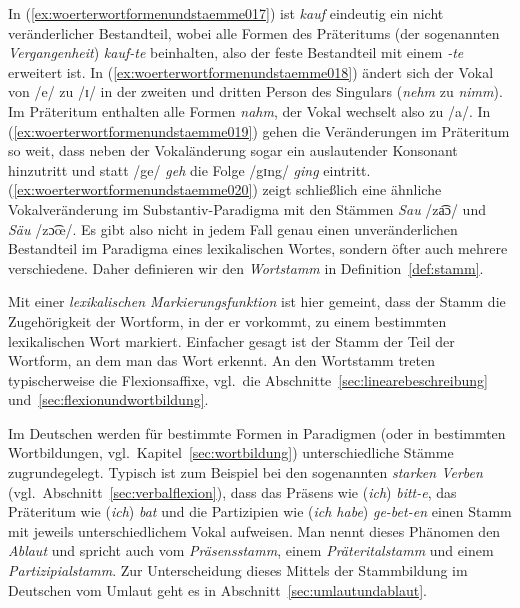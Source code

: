 In (\ref{ex:woerterwortformenundstaemme017}) ist \textit{kauf} eindeutig ein nicht veränderlicher Bestandteil, wobei alle Formen des Präteritums (der sogenannten \textit{Vergangenheit}) \textit{kauf-te} beinhalten, also der feste Bestandteil mit einem \textit{-te} erweitert ist.
In (\ref{ex:woerterwortformenundstaemme018}) ändert sich der Vokal von /e/ zu /ɪ/ in der zweiten und dritten Person des Singulars (\textit{nehm} zu \textit{nimm}).
Im Präteritum enthalten alle Formen \textit{nahm}, der Vokal wechselt also zu /a/.
In (\ref{ex:woerterwortformenundstaemme019}) gehen die Veränderungen im Präteritum so weit, dass neben der Vokaländerung sogar ein auslautender Konsonant hinzutritt und statt /ge/ \textit{geh} die Folge /gɪng/ \textit{ging} eintritt.
(\ref{ex:woerterwortformenundstaemme020}) zeigt schließlich eine ähnliche Vokalveränderung im Substantiv-Paradigma mit den Stämmen \textit{Sau} /za͡ɔ/ und \textit{Säu} /zɔ͡œ/.
Es gibt also nicht in jedem Fall genau einen unveränderlichen Bestandteil im Paradigma eines lexikalischen Wortes, sondern öfter auch mehrere verschiedene.
Daher definieren wir den \textit{Wortstamm} in Definition~\ref{def:stamm}.



Mit einer \textit{lexikalischen Markierungsfunktion} ist hier gemeint, dass der Stamm die Zugehörigkeit der Wortform, in der er vorkommt, zu einem bestimmten lexikalischen Wort markiert.
Einfacher gesagt ist der Stamm der Teil der Wortform, an dem man das Wort erkennt.
An den Wortstamm treten typischerweise die Flexionsaffixe, vgl.\ die Abschnitte~\ref{sec:linearebeschreibung} und~\ref{sec:flexionundwortbildung}.

Im Deutschen werden für bestimmte Formen in Paradigmen (oder in bestimmten Wortbildungen, vgl.\ Kapitel~\ref{sec:wortbildung}) unterschiedliche Stämme zugrundegelegt.
Typisch ist zum Beispiel bei den sogenannten \textit{starken Verben} (vgl.\ Abschnitt~\ref{sec:verbalflexion}), dass das Präsens wie (\textit{ich}) \textit{bitt-e}, das Präteritum wie (\textit{ich}) \textit{bat} und die Partizipien wie (\textit{ich habe}) \textit{ge-bet-en} einen Stamm mit jeweils unterschiedlichem Vokal aufweisen.
Man nennt dieses Phänomen den \textit{Ablaut} und spricht auch vom \textit{Präsensstamm}, einem \textit{Präteritalstamm} und einem \textit{Partizipialstamm}.
Zur Unterscheidung dieses Mittels der Stammbildung im Deutschen vom Umlaut geht es in Abschnitt~\ref{sec:umlautundablaut}.

